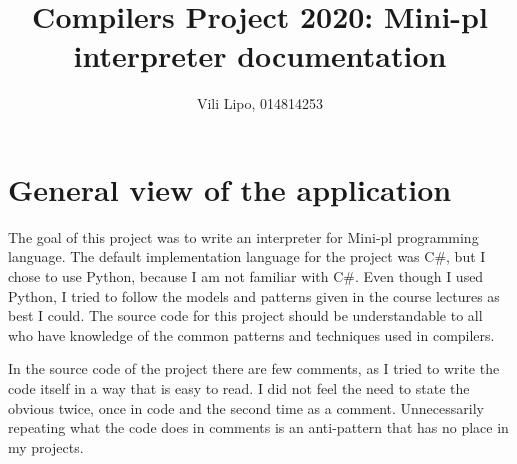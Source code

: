 \documentclass[12pt,a4paper]{article}
\author{Vili Lipo, 014814253}
\title{Compilers Project 2020: Mini-pl interpreter documentation}
\begin{document}
\maketitle
\newpage

\section{General view of the application}
The goal of this project was to write an interpreter for 
Mini-pl programming language. The default implementation language
for the project was C\#, but I chose to use Python, because
I am not familiar with C\#. Even though I used Python, I tried
to follow the models and patterns given in the course lectures 
as best I could. The source code for this project should be 
understandable to all who have knowledge of the common patterns
and techniques used in compilers.

In the source code of the project there are few comments, as I tried to write
the code itself in a way that is easy to read. I did not feel the need to state
the obvious twice, once in code and the second time as a comment.
Unnecessarily repeating what the code does in comments is an anti-pattern that
has no place in my projects.
\end{document}
